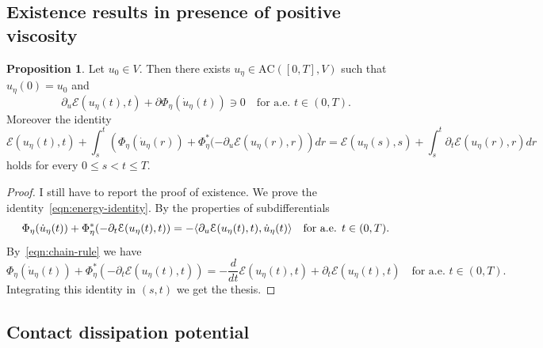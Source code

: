 \documentclass[letterpaper,oneside]{amsart}
\numberwithin{equation}{section}
\theoremstyle{definition}
\newtheorem{prop}{Proposition}[section]
\DeclarePairedDelimiter{\dual}{\langle}{\rangle}
\begin{document}
\subsection{Existence results in presence of positive viscosity}

\begin{prop}
Let $u_0\in V$. Then there exists $u_\eta\in\text{AC}([0,T],V)$ such that $u_\eta(0)=u_0$ and
\begin{equation*}
\partial_u\mathcal{E}(u_\eta(t),t)+\partial\Phi_\eta(\dot u_\eta(t))\ni0\quad\text{for a.e. $t\in(0,T)$}.
\end{equation*}
Moreover the identity
\begin{equation}
\label{eqn:energy-identity}
\mathcal{E}(u_\eta(t),t)+\int_s^t\left(\Phi_\eta(\dot u_\eta(r))+\Phi_\eta^*(-\partial_u\mathcal{E}(u_\eta(r),r)\right)dr=\mathcal{E}(u_\eta(s),s)+\int_s^t\partial_t\mathcal{E}(u_\eta(r),r)dr
\end{equation}
holds for every $0\le s<t\le T$.
\end{prop}
\begin{proof}
I still have to report the proof of existence. We prove the identity~\eqref{eqn:energy-identity}. By the properties of subdifferentials
\begin{equation*}
\Phi_\eta(\dot u_\eta(t))+\Phi_\eta^*(-\partial_t\mathcal{E}(u_\eta(t),t))=-\dual{\partial_u\mathcal{E}(u_\eta(t),t),\dot u_\eta(t)}\quad\text{for a.e. $t\in(0,T)$}.
\end{equation*}
By~\eqref{eqn:chain-rule} we have
\begin{equation*}
\Phi_\eta(\dot u_\eta(t))+\Phi_\eta^*(-\partial_t\mathcal{E}(u_\eta(t),t))=-\frac{d}{dt}\mathcal{E}(u_\eta(t),t)+\partial_t\mathcal{E}(u_\eta(t),t)\quad\text{for a.e. $t\in(0,T)$}.
\end{equation*}
Integrating this identity in $(s,t)$ we get the thesis.
\end{proof}

\subsection{Contact dissipation potential}
\end{document}
